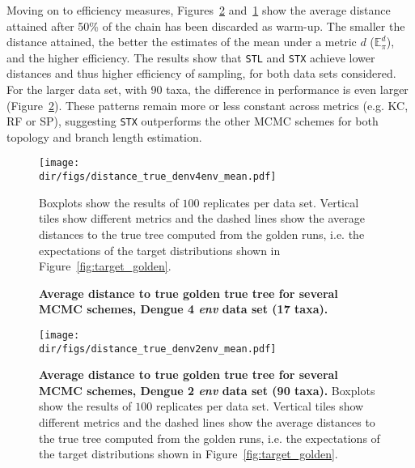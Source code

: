 Moving on to efficiency measures, Figures~\ref{fig:distance_true_denv2_mean} and~\ref{fig:distance_true_denv4_mean} show the average distance attained after 50\% of the chain has been discarded as warm-up.
The smaller the distance attained, the better the estimates of the mean under a metric $d$ ($\mathbb{E}_\pi^d$), and the higher efficiency.  
The results show that \verb|STL| and \verb|STX| achieve lower distances and thus higher efficiency of sampling, for both data sets considered.
For the larger data set, with 90 taxa, the difference in performance is even larger (Figure~\ref{fig:distance_true_denv2_mean}).
These patterns remain more or less constant across metrics (e.g. KC, RF or SP), suggesting \verb|STX| outperforms the other MCMC schemes for both topology and branch length estimation. 
\begin{figure}[!ht]
\begin{center}
\texttt{[image: \\dir/figs/distance\_true\_denv4env\_mean.pdf]} 
\end{center}
 \caption[Average distance to true golden true tree for several MCMC schemes, Dengue 4 \textit{env} data set (17 taxa).]{\textbf{Average distance to true golden true tree for several MCMC schemes, Dengue 4 \textit{env} data set (17 taxa).}
  }
  Boxplots show the results of $100$ replicates per data set.
  Vertical tiles show different metrics and the dashed lines show the average distances to the true tree computed from the golden runs, i.e. the expectations of the target distributions shown in Figure~\ref{fig:target_golden}.
 \label{fig:distance_true_denv4_mean}
\end{figure}
\begin{figure}[!ht]
\begin{center}
\texttt{[image: \\dir/figs/distance\_true\_denv2env\_mean.pdf]} 
\end{center}
 \caption[Average distance to true golden true tree for several MCMC schemes, Dengue 2 \textit{env} data set (90 taxa).]{\textbf{Average distance to true golden true tree for several MCMC schemes, Dengue 2 \textit{env} data set (90 taxa).}
  Boxplots show the results of $100$ replicates per data set.
  Vertical tiles show different metrics and the dashed lines show the average distances to the true tree computed from the golden runs, i.e. the expectations of the target distributions shown in Figure~\ref{fig:target_golden}.
  }
 \label{fig:distance_true_denv2_mean}
\end{figure}

